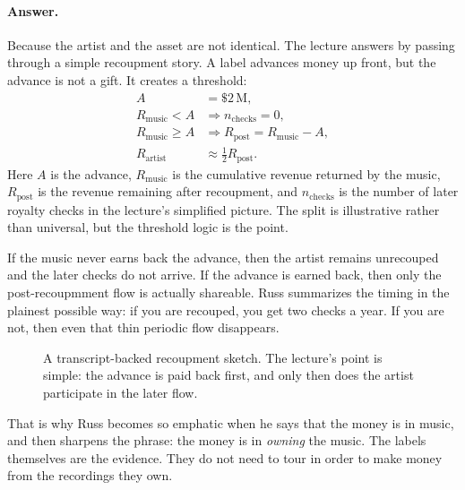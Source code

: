 \paragraph{Answer.} Because the artist and the asset are not identical. The lecture answers by passing through a simple recoupment story. A label advances money up front, but the advance is not a gift. It creates a threshold:
\begin{align}
A &= \$2\,\mathrm{M},\\
R_{\mathrm{music}}<A &\Longrightarrow n_{\mathrm{checks}}=0,\\
R_{\mathrm{music}}\ge A &\Longrightarrow R_{\mathrm{post}}=R_{\mathrm{music}}-A,\\
R_{\mathrm{artist}} &\approx \frac{1}{2}R_{\mathrm{post}}.
\end{align}
Here \(A\) is the advance, \(R_{\mathrm{music}}\) is the cumulative revenue returned by the music, \(R_{\mathrm{post}}\) is the revenue remaining after recoupment, and \(n_{\mathrm{checks}}\) is the number of later royalty checks in the lecture's simplified picture. The split is illustrative rather than universal, but the threshold logic is the point.

If the music never earns back the advance, then the artist remains unrecouped and the later checks do not arrive. If the advance is earned back, then only the post-recoupmment flow is actually shareable. Russ summarizes the timing in the plainest possible way: if you are recouped, you get two checks a year. If you are not, then even that thin periodic flow disappears.

\begin{figure}
\centering
{}
\caption{A transcript-backed recoupment sketch. The lecture's point is simple: the advance is paid back first, and only then does the artist participate in the later flow.}
\end{figure}

That is why Russ becomes so emphatic when he says that the money is in music, and then sharpens the phrase: the money is in \emph{owning} the music. The labels themselves are the evidence. They do not need to tour in order to make money from the recordings they own.

